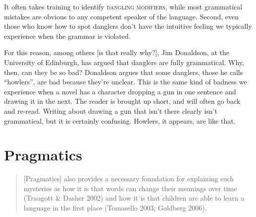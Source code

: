             It often takes training to identify \textsc{dangling modifiers}, while most grammatical mistakes are obvious to any competent speaker of the language. Second, even those who know how to spot danglers don't have the intuitive feeling we typically experience when the grammar is violated.
            
            For this reason, among others [is that really why?], Jim Donaldson, at the University of Edinburgh, has argued that danglers are fully grammatical. Why, then, can they be so bad? Donaldson argues that some danglers, those he calls ``howlers'', are bad because they're unclear. This is the same kind of badness we experience when a novel has a character dropping a gun in one sentence and drawing it in the next. The reader is brought up short, and will often go back and re-read. Writing about drawing a gun that isn't there clearly isn't grammatical, but it is certainly confusing. Howlers, it appears, are like that.



\section{Pragmatics} 
\begin{quote}
    [Pragmatics] also provides a necessary foundation for explaining such mysteries as how it is that words can change their meanings over time (Traugott \& Dasher 2002) and how it is that children are able to learn a language in the first place (Tomasello 2003; Goldberg 2006).\cite[17]{Israel2011}
\end{quote}